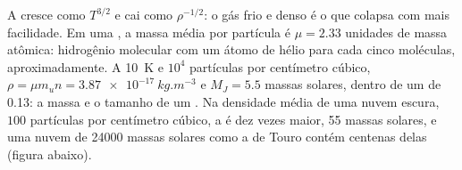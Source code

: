 A  cresce como $T^{3/2}$ e cai como $\rho^{-1/2}$: o gás frio e denso
é o que colapsa com mais facilidade. Em uma , a massa média por partícula é
$\mu = 2.33$ unidades de massa atômica: hidrogênio molecular com um átomo de hélio para
cada cinco moléculas, aproximadamente. A \qty{10}{K} e $10^4$ partículas por centímetro
cúbico, $\rho = \mu m_u n = \qty{3.87e-17}{kg.m^{-3}}$ e
$M_J = 5.5$ massas solares, dentro de um  de \qty{0.13}{\parsec}:
a massa e o tamanho de um . Na densidade média de uma nuvem escura,
$100$ partículas por centímetro cúbico, a  é dez vezes maior, 55
massas solares, e uma nuvem de \num{24000} massas solares como a de Touro contém
centenas delas (figura abaixo).

